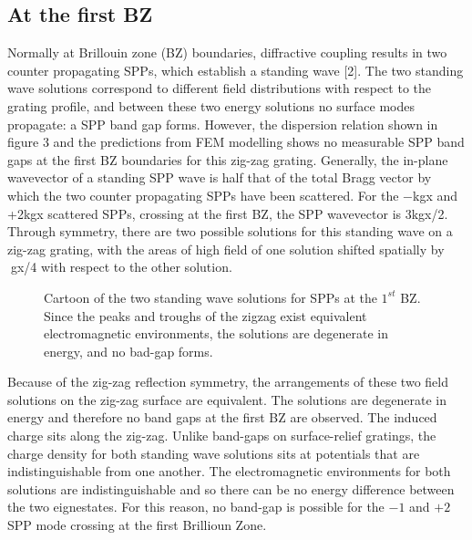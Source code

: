 \documentclass[oneside,11pt,book]{book}
\begin{document}
\subsection{At the first BZ}
Normally at Brillouin zone (BZ) boundaries, diffractive coupling results in two counter propagating SPPs, which establish a standing wave [2]. The two standing wave solutions correspond to different field distributions with respect to the grating profile, and between these two energy solutions no surface modes propagate: a SPP band gap forms. However, the dispersion relation shown in figure 3 and the predictions from FEM modelling shows no measurable SPP band gaps at the first BZ
boundaries for this zig-zag grating. Generally, the in-plane wavevector of a standing SPP wave is half that of the total Bragg vector by which the two counter propagating SPPs have been scattered. For the −kgx and +2kgx scattered SPPs, crossing at the first BZ, the SPP wavevector is 3kgx/2. Through symmetry, there are two possible solutions for this standing wave on a zig-zag grating, with the areas of high field of one solution shifted spatially by gx/4 with respect to the other solution. 
\begin{figure}
	\begin{subfigure}[b]{0.5\linewidth}
		\centering
		\centering\subcaption{}
	\end{subfigure}
	\begin{subfigure}[b]{0.5\linewidth}
		\centering
		\centering\subcaption{}
	\end{subfigure}
\caption{Cartoon of the two standing wave solutions for SPPs at the $1^{st}$ BZ. Since the peaks and troughs of the zigzag exist equivalent electromagnetic environments, the solutions are degenerate in energy, and no bad-gap forms.}
\end{figure}
Because of the zig-zag reflection symmetry, the arrangements of these two field solutions on the zig-zag surface are equivalent. The solutions are degenerate in energy and therefore no band gaps at the first BZ are observed.
The induced charge sits along the zig-zag. Unlike band-gaps on surface-relief gratings, the charge density for both standing wave solutions sits at potentials that are indistinguishable from one another. The electromagnetic environments for both solutions are indistinguishable and so there can be no energy difference between the two eignestates. For this reason, no band-gap is possible for the $-1$ and $+2$ SPP mode crossing at the first Brillioun Zone.
\end{document}
